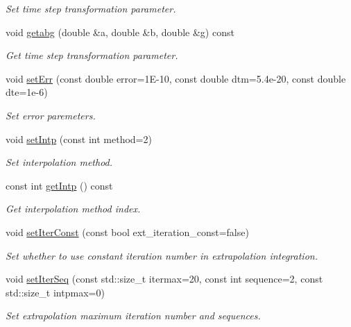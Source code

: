 \begin{DoxyCompactItemize}
\begin{DoxyCompactList}\small\item\em Set time step transformation parameter. \end{DoxyCompactList}\item 
void \hyperlink{classARC_1_1chainpars_ab248ae7b53ef1942880870710267fa36}{getabg} (double \&a, double \&b, double \&g) const
\begin{DoxyCompactList}\small\item\em Get time step transformation parameter. \end{DoxyCompactList}\item 
void \hyperlink{classARC_1_1chainpars_a68e2a1dc0eb7de2303661b1124cd0811}{set\+Err} (const double error=1\+E-\/10, const double dtm=5.\+4e-\/20, const double dte=1e-\/6)
\begin{DoxyCompactList}\small\item\em Set error paremeters. \end{DoxyCompactList}\item 
void \hyperlink{classARC_1_1chainpars_a3202628c37841ff8b36a80095ee15af3}{set\+Intp} (const int method=2)
\begin{DoxyCompactList}\small\item\em Set interpolation method. \end{DoxyCompactList}\item 
const int \hyperlink{classARC_1_1chainpars_a1b8acf4c95dcb454d5c3f6aaaeb1b358}{get\+Intp} () const
\begin{DoxyCompactList}\small\item\em Get interpolation method index. \end{DoxyCompactList}\item 
void \hyperlink{classARC_1_1chainpars_a84fe5bb032696dae76ce1aa9e6dd1a63}{set\+Iter\+Const} (const bool ext\+\_\+iteration\+\_\+const=false)
\begin{DoxyCompactList}\small\item\em Set whether to use constant iteration number in extrapolation integration. \end{DoxyCompactList}\item 
void \hyperlink{classARC_1_1chainpars_a61cc2580dcf06d4e85e068272b4b5b95}{set\+Iter\+Seq} (const std\+::size\+\_\+t itermax=20, const int sequence=2, const std\+::size\+\_\+t intpmax=0)
\begin{DoxyCompactList}\small\item\em Set extrapolation maximum iteration number and sequences. \end{DoxyCompactList}\item 

\end{DoxyCompactItemize}
